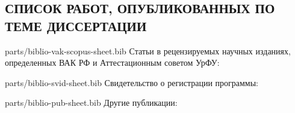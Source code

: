 
%
%
%
%

\subsection*{\MakeUppercase{Список работ, опубликованных по теме диссертации}}

\begin{btSect}{parts/biblio-vak-scopus-sheet.bib}
Статьи в рецензируемых научных изданиях,
определенных ВАК РФ и Аттестационным советом УрФУ: \btPrintAll

\end{btSect}

\begin{btSect}{parts/biblio-svid-sheet.bib}
 Свидетельство о регистрации программы: \btPrintAll
\end{btSect}

\begin{btSect}{parts/biblio-pub-sheet.bib}
  Другие публикации: \btPrintAll
\end{btSect}



